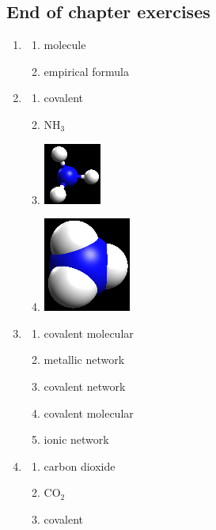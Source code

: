 \subsection{End of chapter exercises} 
\begin{multicols}{3}
\begin{enumerate}[noitemsep, label=\textbf{\arabic*}. ] 
\item %
    \begin{enumerate}[noitemsep, label=\textbf{(\alph*)} ]
  \item molecule
\item empirical formula
 \end{enumerate}
\end{enumerate}
\begin{enumerate}[noitemsep, label=\textbf{(\arabic*)} ]
\setcounter{enumi}{1}
\item %
    \begin{enumerate}[noitemsep, label=\textbf{(\alph*)} ]
 \item covalent
\item $\text{NH}_{3}$
\item \includegraphics[width=.1\textwidth]{photos/composition_ammonia_ballstick.png}
\item \includegraphics[width=.1\textwidth]{photos/composition_ammonia_spacefill.png}
\end{enumerate}
\item %
    \begin{enumerate}[noitemsep, label=\textbf{(\alph*)} ]
 \item covalent molecular
\item metallic network
\item covalent network
\item covalent molecular
\item ionic network
\end{enumerate}
\item %
    \begin{enumerate}[noitemsep, label=\textbf{(\alph*)} ]
 \item carbon dioxide
\item $\text{CO}_2$
\item covalent
\end{enumerate}
\end{enumerate}
\end{multicols}


